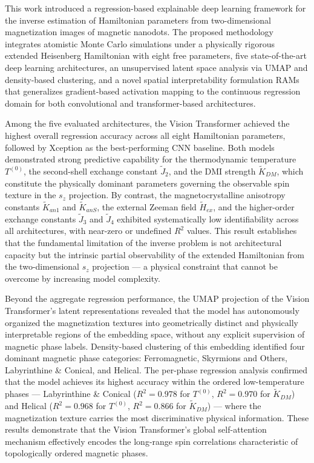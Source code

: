 \documentclass[final,5p,times,twocolumn]{elsarticle}
\begin{document}
This work introduced a regression-based explainable deep learning
framework for the inverse estimation of Hamiltonian parameters from
two-dimensional magnetization images of magnetic nanodots. The
proposed methodology integrates atomistic Monte Carlo simulations
under a physically rigorous extended Heisenberg Hamiltonian with eight
free parameters, five state-of-the-art deep learning architectures, an
unsupervised latent space analysis via UMAP and density-based
clustering, and a novel spatial interpretability formulation RAMs that generalizes gradient-based
activation mapping to the continuous regression domain for both
convolutional and transformer-based architectures.
 
Among the five evaluated architectures, the Vision Transformer
achieved the highest overall regression accuracy across all eight
Hamiltonian parameters, followed by Xception as the best-performing
CNN baseline. Both models demonstrated strong predictive capability
for the thermodynamic temperature $T^{(0)}$, the second-shell exchange
constant $\tilde{J}_2$, and the DMI
strength $\tilde{K}_{DM}$, which constitute the physically dominant
parameters governing the observable spin texture in the $s_z$
projection. By contrast, the magnetocrystalline anisotropy constants
$\tilde{K}_{an1}$ and $\tilde{K}_{anS}$, the external Zeeman field
$\tilde{H}_{ex}$, and the higher-order exchange constants
$\tilde{J}_3$ and $\tilde{J}_4$ exhibited systematically low
identifiability across all architectures, with near-zero or undefined
$R^2$ values. This result establishes that the fundamental limitation
of the inverse problem is not architectural capacity but the intrinsic
partial observability of the extended Hamiltonian from the
two-dimensional $s_z$ projection --- a physical constraint that cannot
be overcome by increasing model complexity.
 
Beyond the aggregate regression performance, the UMAP projection of
the Vision Transformer's latent representations revealed that the
model has autonomously organized the magnetization textures into
geometrically distinct and physically interpretable regions of the
embedding space, without any explicit supervision of magnetic phase
labels. Density-based clustering of this embedding identified four
dominant magnetic phase categories: Ferromagnetic, Skyrmions and
Others, Labyrinthine \& Conical, and Helical. The per-phase regression
analysis confirmed that the model achieves its highest accuracy within
the ordered low-temperature phases --- Labyrinthine \& Conical
($R^2 = 0.978$ for $T^{(0)}$, $R^2 = 0.970$ for $\tilde{K}_{DM}$) and
Helical ($R^2 = 0.968$ for $T^{(0)}$, $R^2 = 0.866$ for
$\tilde{K}_{DM}$) --- where the magnetization texture carries the most
discriminative physical information. These results demonstrate that
the Vision Transformer's global self-attention mechanism effectively
encodes the long-range spin correlations characteristic of
topologically ordered magnetic phases.
 
\end{document}
